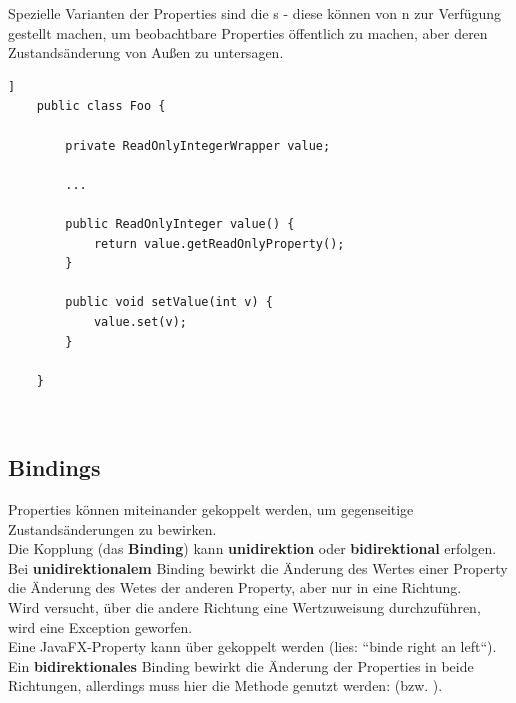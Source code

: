 \noindent
Spezielle Varianten der Properties sind die s - diese können von n zur Verfügung gestellt machen, um beobachtbare Properties öffentlich zu machen, aber deren Zustandsänderung von Außen zu untersagen.

\begin{verbatim}]
    public class Foo {

        private ReadOnlyIntegerWrapper value;

        ...

        public ReadOnlyInteger value() {
            return value.getReadOnlyProperty();
        }

        public void setValue(int v) {
            value.set(v);
        }

    }
\end{verbatim}\\

\subsection{Bindings}

Properties können miteinander gekoppelt werden, um gegenseitige Zustandsänderungen zu bewirken.\\

\noindent
Die Kopplung (das \textbf{Binding}) kann \textbf{unidirektion} oder \textbf{bidirektional} erfolgen.\\

\noindent
Bei \textbf{unidirektionalem} Binding bewirkt die Änderung des Wertes einer Property die Änderung des Wetes der anderen Property, aber nur in eine Richtung.\\
Wird versucht, über die andere Richtung eine Wertzuweisung durchzuführen, wird eine Exception geworfen.\\
Eine JavaFX-Property kann über  gekoppelt werden (lies: ``binde right an left``).\\

\noindent
Ein \textbf{bidirektionales} Binding bewirkt die Änderung der Properties in beide Richtungen, allerdings muss hier die Methode  genutzt werden:  (bzw. ).


